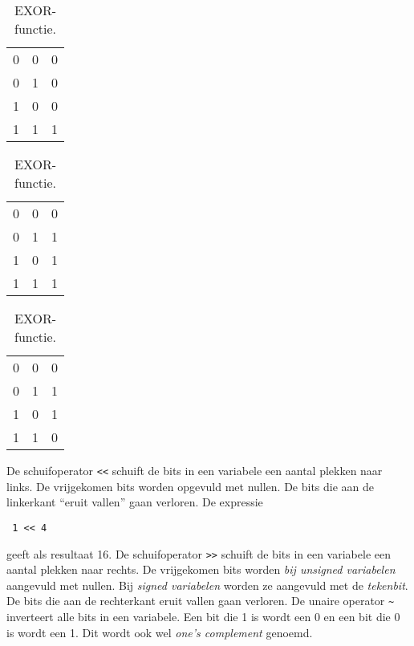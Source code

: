 \begin{table}[!ht]
\centering
\caption{De drie bitsgewijze operatoren.}
\label{tab:driebaisfuncties}
\begin{subtable}[t]{0.333\textwidth}
\centering
\caption{AND-functie.}
\label{tab:enbasisfunctie}
\begin{tabular}{cc|c}
0 & 0 & 0  \\
0 & 1 & 0  \\
1 & 0 & 0  \\
1 & 1 & 1  \\
\end{tabular}
\end{subtable}%
\begin{subtable}[t]{0.333\textwidth}
\centering
\caption{OR-functie.}
\label{tab:ofbasisfunctie}
\begin{tabular}{cc|c}
0 & 0 & 0  \\
0 & 1 & 1  \\
1 & 0 & 1  \\
1 & 1 & 1  \\
\end{tabular}
\end{subtable}%
\begin{subtable}[t]{0.333\textwidth}
\centering
\caption{EXOR-functie.}
\label{tab:exofbasisfunctie}
\begin{tabular}{cc|c}
0 & 0 & 0  \\
0 & 1 & 1  \\
1 & 0 & 1  \\
1 & 1 & 0  \\
\end{tabular}
\end{subtable}
\end{table}

De schuifoperator \texttt{<<} schuift de bits in een variabele een aantal plekken naar links. De vrijgekomen bits worden opgevuld met nullen. De bits die aan de linkerkant ``eruit vallen'' gaan verloren. De expressie

\hspace*{1em}\texttt{ 1 << 4}

geeft als resultaat 16. De schuifoperator \texttt{>>} schuift de bits in een variabele een aantal plekken naar rechts. De vrijgekomen bits worden \textsl{bij unsigned variabelen} aangevuld met nullen. Bij  \textsl{signed variabelen} worden ze aangevuld met de \textsl{tekenbit}. De bits die aan de rechterkant eruit vallen gaan verloren. De unaire operator \texttt{\textasciitilde} inverteert alle bits in een variabele. Een bit die 1 is wordt een 0 en een bit die 0 is wordt een 1. Dit wordt ook wel \textsl{one's complement} genoemd.

